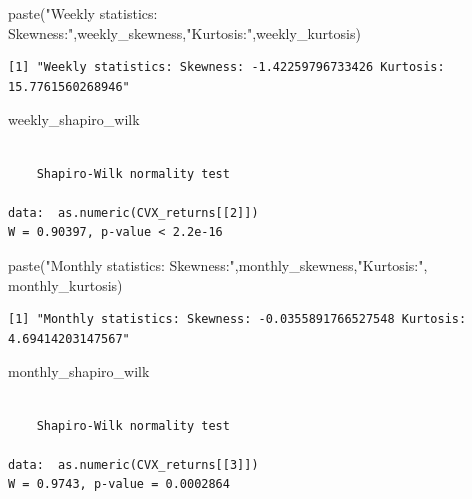 \documentclass[
  letterpaper,
  DIV=11,
  numbers=noendperiod]{scrartcl}
\newenvironment{Shaded}{\begin{snugshade}}{\end{snugshade}}
\newcommand{\FunctionTok}[1]{\textcolor[rgb]{0.28,0.35,0.67}{#1}}
\newcommand{\NormalTok}[1]{\textcolor[rgb]{0.00,0.23,0.31}{#1}}
\newcommand{\StringTok}[1]{\textcolor[rgb]{0.13,0.47,0.30}{#1}}
\begin{document}
\begin{Shaded}
\begin{Highlighting}[]
\FunctionTok{paste}\NormalTok{(}\StringTok{"Weekly statistics: Skewness:"}\NormalTok{,weekly\_skewness,}\StringTok{"Kurtosis:"}\NormalTok{,weekly\_kurtosis)}
\end{Highlighting}
\end{Shaded}

\begin{verbatim}
[1] "Weekly statistics: Skewness: -1.42259796733426 Kurtosis: 15.7761560268946"
\end{verbatim}

\begin{Shaded}
\begin{Highlighting}[]
\NormalTok{weekly\_shapiro\_wilk}
\end{Highlighting}
\end{Shaded}

\begin{verbatim}

    Shapiro-Wilk normality test

data:  as.numeric(CVX_returns[[2]])
W = 0.90397, p-value < 2.2e-16
\end{verbatim}

\begin{Shaded}
\begin{Highlighting}[]
\FunctionTok{paste}\NormalTok{(}\StringTok{"Monthly statistics: Skewness:"}\NormalTok{,monthly\_skewness,}\StringTok{"Kurtosis:"}\NormalTok{,}
\NormalTok{      monthly\_kurtosis)}
\end{Highlighting}
\end{Shaded}

\begin{verbatim}
[1] "Monthly statistics: Skewness: -0.0355891766527548 Kurtosis: 4.69414203147567"
\end{verbatim}

\begin{Shaded}
\begin{Highlighting}[]
\NormalTok{monthly\_shapiro\_wilk}
\end{Highlighting}
\end{Shaded}

\begin{verbatim}

    Shapiro-Wilk normality test

data:  as.numeric(CVX_returns[[3]])
W = 0.9743, p-value = 0.0002864
\end{verbatim}
\end{document}

